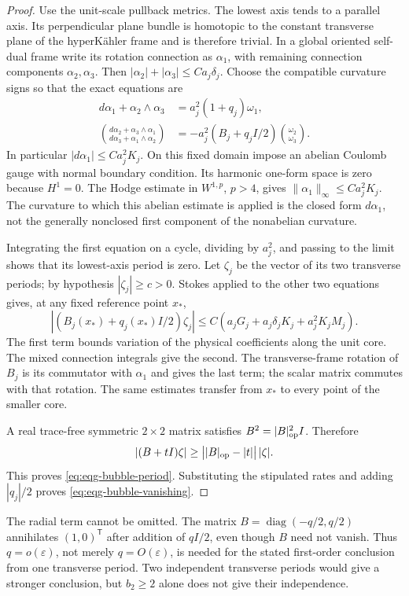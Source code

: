 \begin{proof}
Use the unit-scale pullback metrics.  The lowest axis tends to a
parallel axis.  Its perpendicular plane bundle is homotopic to the
constant transverse plane of the hyperKähler frame and is therefore
trivial.  In a global oriented self-dual frame write its rotation
connection as $\alpha_1$, with remaining connection components
$\alpha_2,\alpha_3$.  Then
$|\alpha_2|+|\alpha_3|\leq Ca_j\delta_j$.
Choose the compatible curvature signs so that the exact equations are
\begin{align}
 d\alpha_1+\alpha_2\wedge\alpha_3
     &=a_j^2(1+q_j)\omega_1,\label{eq:eqg-bubble-curvature}\\
 \binom{d\alpha_2+\alpha_3\wedge\alpha_1}
       {d\alpha_3+\alpha_1\wedge\alpha_2}
     &=-a_j^2(B_j+q_jI/2)\binom{\omega_2}{\omega_3}.
       \nonumber
\end{align}
In particular $|d\alpha_1|\leq Ca_j^2K_j$.
On this fixed domain impose an abelian Coulomb gauge with normal
boundary condition.  Its harmonic one-form space is zero because
$H^1=0$.  The Hodge estimate in $W^{1,p}$, $p>4$, gives
$\|\alpha_1\|_\infty\leq Ca_j^2K_j$.
The curvature to which this abelian estimate is applied is the closed
form $d\alpha_1$, not the generally nonclosed first component of the
nonabelian curvature.

Integrating the first equation on a cycle, dividing by $a_j^2$,
and passing to the limit shows that its lowest-axis period is zero.
Let $\zeta_j$ be the vector of its two transverse periods;
by hypothesis $|\zeta_j|\geq c>0$.
Stokes applied to the other two equations gives, at any fixed
reference point $x_*$,
\[
 |(B_j(x_*)+q_j(x_*)I/2)\zeta_j|
 \leq C(a_jG_j+a_j\delta_jK_j+a_j^2K_jM_j).
\]
The first term bounds variation of the physical coefficients along
the unit core.  The mixed connection integrals give the second.
The transverse-frame rotation of $B_j$ is its commutator with
$\alpha_1$ and gives the last term; the scalar matrix commutes with
that rotation.  The same estimates transfer from $x_*$ to every
point of the smaller core.

A real trace-free symmetric $2\times2$ matrix satisfies
$B^2=|B|_{\rm op}^2I$.  Therefore
\[
 |(B+tI)\zeta|\geq
 \bigl||B|_{\rm op}-|t|\bigr|\,|\zeta|.
\]
This proves \eqref{eq:eqg-bubble-period}.  Substituting the stipulated
rates and adding $|q_j|/2$ proves
\eqref{eq:eqg-bubble-vanishing}.
\end{proof}

The radial term cannot be omitted.  The matrix
$B=\operatorname{diag}(-q/2,q/2)$ annihilates $(1,0)^{\mathsf T}$
after addition of $qI/2$, even though $B$ need not vanish.  Thus
$q=o(\varepsilon)$, not merely $q=O(\varepsilon)$, is needed for
the stated first-order conclusion from one transverse period.
Two independent transverse periods would give a stronger conclusion,
but $b_2\geq2$ alone does not give their independence.

